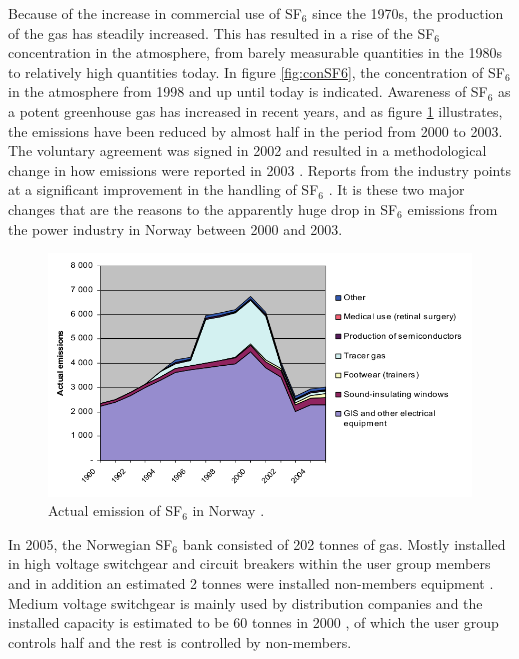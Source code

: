 \documentclass[10pt,a4paper,twoside]{article}
\begin{document}
Because of the increase in commercial use of SF$_6$ since the 1970s, the production of the gas has steadily increased. This has resulted in a rise of the SF$_6$ concentration in the atmosphere, from barely measurable quantities in the 1980s \cite{bib:SF6PI} to relatively high quantities today. In figure \ref{fig:conSF6}, the concentration of SF$_6$ in the atmosphere from 1998 and up until today is indicated. Awareness of SF$_6$ as a potent greenhouse gas has increased in recent years, and as figure \ref{fig:SF6EmissNor} illustrates, the emissions have been reduced by almost half in the period from 2000 to 2003. The voluntary agreement was signed in 2002 and resulted in a methodological change in how emissions were reported in 2003 \cite{bib:regSF6Miljo}. Reports from the industry points at a significant improvement in the handling of SF$_6$ \cite{bib:StatSF6}. It is these two major changes that are the reasons to the apparently huge drop in SF$_6$ emissions from the power industry in Norway between 2000 and 2003.

\begin{figure}[H]
\centering
\includegraphics[scale=0.6]{Bilder/Theory/emissionsSF6Norway.png}
\caption{Actual emission of SF$_6$ in Norway \cite{bib:StatSF6}.} \label{fig:SF6EmissNor}
\end{figure}

In 2005, the Norwegian SF$_6$ bank consisted of 202 tonnes of gas. Mostly installed in high voltage switchgear and circuit breakers within the user group members and in addition an estimated 2 tonnes were installed non-members equipment \cite{bib:StatSF6}. Medium voltage switchgear is mainly used by distribution companies and the installed capacity is estimated to be 60 tonnes in 2000 \cite{bib:StatSF6}, of which the user group controls half and the rest is controlled by non-members.
\end{document}
